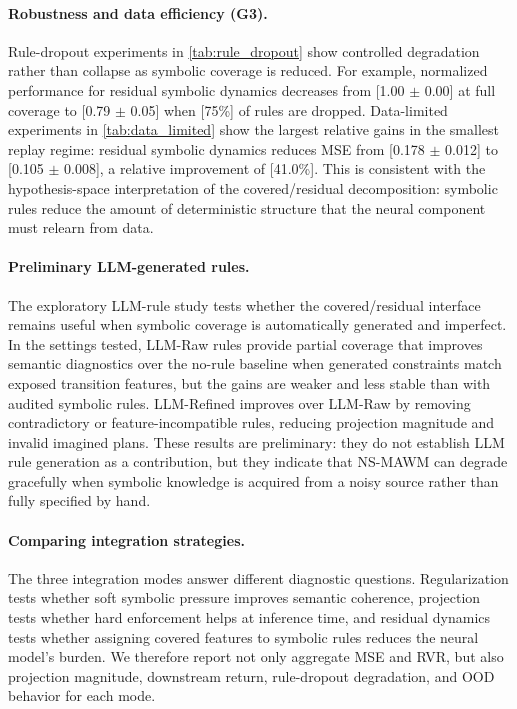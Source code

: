 \documentclass{article}
\theoremstyle{plain}
\theoremstyle{definition}
\theoremstyle{remark}
\begin{document}
\paragraph{Robustness and data efficiency (G3).}
Rule-dropout experiments in \autoref{tab:rule_dropout} show controlled degradation rather than collapse as symbolic coverage is reduced. For example, normalized performance for residual symbolic dynamics decreases from [1.00 $\pm$ 0.00] at full coverage to [0.79 $\pm$ 0.05] when [75\%] of rules are dropped. Data-limited experiments in \autoref{tab:data_limited} show the largest relative gains in the smallest replay regime: residual symbolic dynamics reduces MSE from [0.178 $\pm$ 0.012] to [0.105 $\pm$ 0.008], a relative improvement of [41.0\%]. This is consistent with the hypothesis-space interpretation of the covered/residual decomposition: symbolic rules reduce the amount of deterministic structure that the neural component must relearn from data.

\paragraph{Preliminary LLM-generated rules.}
The exploratory LLM-rule study tests whether the covered/residual interface remains useful when symbolic coverage is automatically generated and imperfect. In the settings tested, LLM-Raw rules provide partial coverage that improves semantic diagnostics over the no-rule baseline when generated constraints match exposed transition features, but the gains are weaker and less stable than with audited symbolic rules. LLM-Refined improves over LLM-Raw by removing contradictory or feature-incompatible rules, reducing projection magnitude and invalid imagined plans. These results are preliminary: they do not establish LLM rule generation as a contribution, but they indicate that NS-MAWM can degrade gracefully when symbolic knowledge is acquired from a noisy source rather than fully specified by hand.

\paragraph{Comparing integration strategies.}
The three integration modes answer different diagnostic questions. Regularization tests whether soft symbolic pressure improves semantic coherence, projection tests whether hard enforcement helps at inference time, and residual dynamics tests whether assigning covered features to symbolic rules reduces the neural model's burden. We therefore report not only aggregate MSE and RVR, but also projection magnitude, downstream return, rule-dropout degradation, and OOD behavior for each mode.
\end{document}

